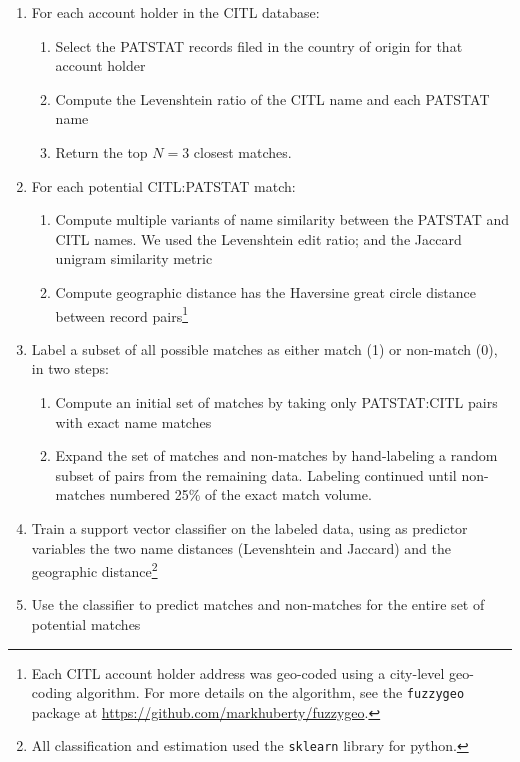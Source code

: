 \documentclass[11pt]{article}
\begin{document}
\begin{enumerate}
\item For each account holder in the CITL database:
  \begin{enumerate}
  \item Select the PATSTAT records filed in the country of origin for
    that account holder
  \item Compute the Levenshtein ratio of the CITL name and each
    PATSTAT name
  \item Return the top $N=3$ closest matches. 
  \end{enumerate}
\item For each potential CITL:PATSTAT match:
  \begin{enumerate}
  \item Compute multiple variants of name similarity between the
    PATSTAT and CITL names. We used the
    Levenshtein edit ratio; and the Jaccard unigram similarity metric
  \item Compute geographic distance has the Haversine great circle
    distance between record pairs\footnote{Each CITL account holder address was
      geo-coded using a city-level geo-coding algorithm. For more
      details on the algorithm, see the \texttt{fuzzygeo} package at \url{https://github.com/markhuberty/fuzzygeo}.}
  \end{enumerate}
\item Label a subset of all possible matches as either match (1) or
  non-match (0), in two steps:
  \begin{enumerate}
  \item Compute an initial set of matches by taking only PATSTAT:CITL
    pairs with exact name matches
  \item Expand the set of matches and non-matches by hand-labeling a
    random subset of pairs from the remaining data. Labeling continued
    until non-matches numbered 25\% of the exact match volume.
  \end{enumerate}
\item Train a support vector classifier on the labeled data, using as
  predictor variables the two name distances (Levenshtein and Jaccard)
  and the geographic distance\footnote{All classification and
    estimation used the \texttt{sklearn} library for python.}
\item Use the classifier to predict matches and
  non-matches for the entire set of potential matches
\end{enumerate}
\end{document}
